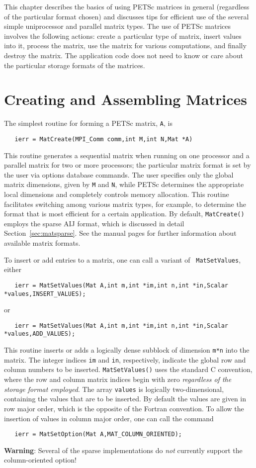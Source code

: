 This chapter describes the basics of using PETSc matrices in general
(regardless of the particular format chosen) and discusses tips for
efficient use of the several simple uniprocessor and parallel matrix
types.  The use of PETSc matrices involves the following actions:
create a particular type of matrix, insert values into it, process the
matrix, use the matrix for various computations, and finally destroy
the matrix.  The application code does not need to know or care about
the particular storage formats of the matrices.

\section{Creating and Assembling Matrices}
\label{sec:matcreate}

The simplest routine for forming a PETSc matrix, {\tt A}, is 
\begin{verbatim}
   ierr = MatCreate(MPI_Comm comm,int M,int N,Mat *A)
\end{verbatim}
This routine generates a sequential matrix when running on one
processor and a parallel matrix for two or more processors; the
particular matrix format is set by the user via options database
commands.  The user specifies only the global matrix dimensions, given
by {\tt M} and {\tt N}, while PETSc determines the appropriate local
dimensions and completely controls memory allocation.  This routine
facilitates switching among various matrix types, for example, to
determine the format that is most efficient for a certain
application.  By default, {\tt MatCreate()} employs the sparse AIJ
format, which is discussed in detail Section~\ref{sec:matsparse}.  See
the manual pages for further information about available matrix formats.

To insert or add entries to a matrix, one can call a variant of {\tt
MatSetValues}, either 
\begin{verbatim}
   ierr = MatSetValues(Mat A,int m,int *im,int n,int *in,Scalar *values,INSERT_VALUES);
\end{verbatim}
or 
\begin{verbatim}
   ierr = MatSetValues(Mat A,int m,int *im,int n,int *in,Scalar *values,ADD_VALUES);
\end{verbatim}
This routine inserts or adds a logically dense subblock of dimension
{\tt m*n} into the 
matrix. The integer indices {\tt im} and {\tt in}, respectively, indicate the 
global row and column numbers to be inserted.  {\tt MatSetValues()} uses the 
standard C convention, where the row and column matrix indices begin with 
zero {\em regardless of the storage format employed}.   The array 
{\tt values} is logically two-dimensional, containing the values that are 
to be inserted.   
By default the values are given in row major order, which is the opposite 
of the Fortran convention. To allow the insertion of values in column 
major order, one can call the command 
\begin{verbatim}
   ierr = MatSetOption(Mat A,MAT_COLUMN_ORIENTED);
\end{verbatim}
{\bf Warning}: Several of the sparse implementations do {\em not} currently support
the column-oriented option!

